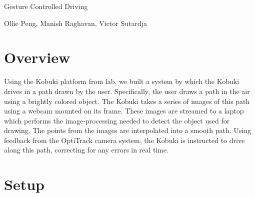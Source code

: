 \documentclass[10pt]{article}
\newenvironment{Figure}
  {\par\medskip\noindent\minipage{\linewidth}}
  {\endminipage\par\medskip}
\begin{document}
\begin{center}
  \Large Gesture Controlled Driving
\end{center}
\begin{center}
  Ollie Peng, Manish Raghavan, Victor Sutardja
\end{center}
\begin{multicols*}{2}
  \section*{Overview}
  Using the Kobuki platform from lab, we built a system by which the Kobuki
  drives in a path drawn by the user. Specifically, the user draws a path in the
  air using a brightly colored object. The Kobuki takes a series of images of
  this path using a webcam mounted on its frame. These images are streamed to a
  laptop which performs the image-processing needed to detect the object used
  for drawing. The points from the images are interpolated into a smooth path.
  Using feedback from the OptiTrack camera system, the Kobuki is instructed to
  drive along this path, correcting for any errors in real time.

  \section*{Setup}
  \begin{Figure}
     \label{fig:info}
  \end{Figure}


\end{multicols*}
\end{document}
